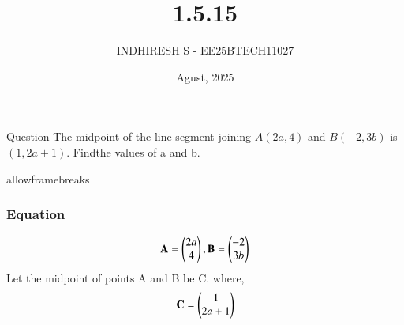 \documentclass{beamer}
\title %
{1.5.15}
\date{Agust, 2025}
\author %
{INDHIRESH S - EE25BTECH11027}
\begin{document}
\frame{\titlepage}
\begin{frame}{Question}
The midpoint of the line segment joining $A(2a, 4)$ and $B(-2, 3b)$ is $(1, 2a + 1)$. Findthe values of a and b.
\end{frame}
\begin{frame}{allowframebreaks}
\frametitle{Equation}

    \centering
    
    \label{tab:parameters}
  \begin{align}
\mathbf{A}= \begin{pmatrix}2a\\4\end{pmatrix} , \mathbf{B}=\begin{pmatrix}-2\\3b\end{pmatrix}
\end{align}
Let the midpoint of points A and B be C. where,
\begin{align}
    \mathbf{C}=\begin{pmatrix}1\\2a+1\end{pmatrix}
\end{align}
   
\end{frame}
\end{document}

